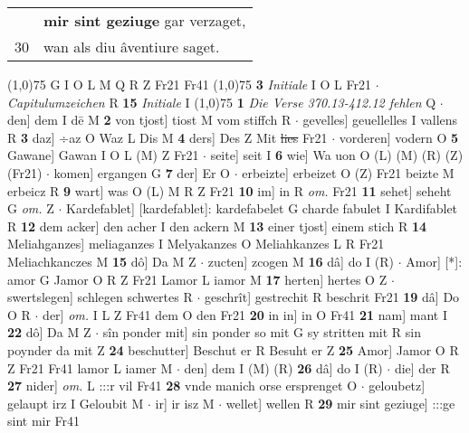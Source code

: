 \documentclass[8pt,a4paper,notitlepage]{article}
\begin{document}
\begin{table}[ht]
\begin{minipage}[t]{0.5\linewidth}
\begin{tabular}{rl}
 & \textbf{mir sint geziuge} gar verzaget,\\ 
30 & wan als diu âventiure saget.\\ 
\end{tabular}
\scriptsize
\line(1,0){75} \newline
G I O L M Q R Z Fr21 Fr41 \newline
\line(1,0){75} \newline
\textbf{3} \textit{Initiale} I O L Fr21   $\cdot$ \textit{Capitulumzeichen} R  \textbf{15} \textit{Initiale} I  \newline
\line(1,0){75} \newline
\textbf{1} \textit{Die Verse 370.13-412.12 fehlen} Q   $\cdot$ den] dem I dē M \textbf{2} von tjost] tiost M vom stiffch R  $\cdot$ gevelles] geuellelles I vallens R \textbf{3} daz] ÷az O Waz L Dis M \textbf{4} ders] Des Z Mit \sout{lies} Fr21  $\cdot$ vorderen] vodern O \textbf{5} Gawane] Gawan I O L (M) Z Fr21  $\cdot$ seite] seit I \textbf{6} wie] Wa uon O (L) (M) (R) (Z) (Fr21)  $\cdot$ komen] ergangen G \textbf{7} der] Er O  $\cdot$ erbeizte] erbeizet O (Z) Fr21 beizte M erbeicz R \textbf{9} wart] was O (L) M R Z Fr21 \textbf{10} im] in R \textit{om.} Fr21 \textbf{11} sehet] seheht G \textit{om.} Z  $\cdot$ Kardefablet] [kardefablet]: kardefabelet G charde fabulet I Kardifablet R \textbf{12} dem acker] den acher I den ackern M \textbf{13} einer tjost] einem stich R \textbf{14} Meliahganzes] meliaganzes I Melyakanzes O Meliahkanzes L R Fr21 Meliachkanczes M \textbf{15} dô] Da M Z  $\cdot$ zucten] zcogen M \textbf{16} dâ] do I (R)  $\cdot$ Amor] [*]: amor G Jamor O R Z Fr21 Lamor L iamor M \textbf{17} herten] hertes O Z  $\cdot$ swertslegen] schlegen schwertes R  $\cdot$ geschrît] gestrechit R beschrit Fr21 \textbf{19} dâ] Do O R  $\cdot$ der] \textit{om.} I L Z Fr41 dem O den Fr21 \textbf{20} in in] in O Fr41 \textbf{21} nam] mant I \textbf{22} dô] Da M Z  $\cdot$ sîn ponder mit] sin ponder so mit G sy stritten mit R sin poynder da mit Z \textbf{24} beschutter] Beschut er R Besuht er Z \textbf{25} Amor] Jamor O R Z Fr21 Fr41 lamor L iamer M  $\cdot$ den] dem I (M) (R) \textbf{26} dâ] do I (R)  $\cdot$ die] der R \textbf{27} nider] \textit{om.} L :::r vil Fr41 \textbf{28} vnde manich orse ersprenget O  $\cdot$ geloubetz] gelaupt irz I Geloubit M  $\cdot$ ir] ir isz M  $\cdot$ wellet] wellen R \textbf{29} mir sint geziuge] :::ge sint mir Fr41 \newline
\end{minipage}
\hspace{0.5cm}
\begin{minipage}[t]{0.5\linewidth}

\end{minipage}
\end{table}
\end{document}
